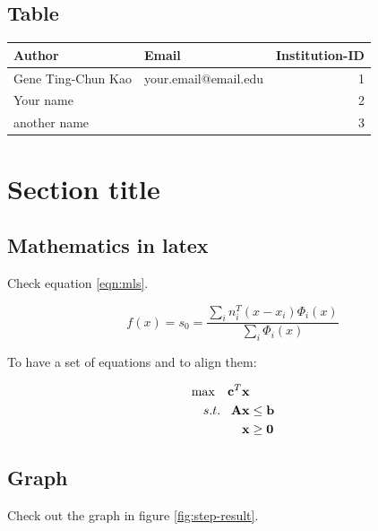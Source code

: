 \documentclass[11pt]{article}
\begin{document}
\subsection*{Table}
\label{sec:orged5cd9e}

\begin{center}
\begin{tabular}{llr}
Author & Email & Institution-ID\\
\hline
Gene Ting-Chun Kao & your.email@email.edu & 1\\
Your name &  & 2\\
another name &  & 3\\
\end{tabular}
\end{center}

\section*{Section title}
\label{sec:org28a54a4}

\subsection*{Mathematics in latex}
\label{sec:org6afb395}

Check equation \ref{eqn:mls}.

\begin{equation}
\label{eqn:mls}
f(x) = {s_0} = \frac{{\sum\limits_i {n_i^T(x - {x_i}){\Phi _i}(x)} }}{{\sum\limits_i {{\Phi _i}(x)} }}
\end{equation}

To have a set of equations and to align them:

\begin{equation}
\begin{array}{l}
\begin{split}
\max \;\;\; {{\bf{c}}^T}{\bf{x}} & \\
s.t. \;\;\; {\bf{Ax}} & \le {\bf{b}} \\
{\bf{x}} & \ge {\bf{0}}
\end{split}
\end{array}
\end{equation}

\subsection*{Graph}
\label{sec:orgdfba1ec}

Check out the graph in figure \ref{fig:step-result}.
\end{document}
